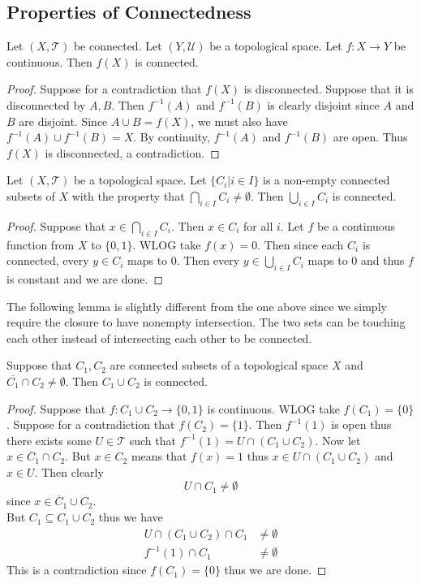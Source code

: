 \documentclass[a4paper]{article}
\begin{document}
\subsection{Properties of Connectedness}
\begin{prp}{}{} Let $(X,\mathcal{T})$ be connected. Let $(Y,\mathcal{U})$ be a topological space. Let $f:X\to Y$ be continuous. Then $f(X)$ is connected. 
\begin{proof}
Suppose for a contradiction that $f(X)$ is disconnected. Suppose that it is disconnected by $A,B$. Then $f^{-1}(A)$ and $f^{-1}(B)$ is clearly disjoint since $A$ and $B$ are disjoint. Since $A\cup B=f(X)$, we must also have $f^{-1}(A)\cup f^{-1}(B)=X$. By continuity, $f^{-1}(A)$ and $f^{-1}(B)$ are open. Thus $f(X)$ is disconnected, a contradiction. 
\end{proof}
\end{prp}

\begin{prp}{}{} Let $(X,\mathcal{T})$ be a topological space. Let $\{C_i|i\in I\}$ is a non-empty connected subsets of $X$ with the property that $\bigcap_{i\in I}C_i\neq\emptyset$. Then $\bigcup_{i\in I}C_i$ is connected. 
\begin{proof}
Suppose that $x\in\bigcap_{i\in I}C_i$. Then $x\in C_i$ for all $i$. Let $f$ be a continuous function from $X$ to $\{0,1\}$. WLOG take $f(x)=0$. Then since each $C_i$ is connected, every $y\in C_i$ maps to $0$. Then every $y\in\bigcup_{i\in I}C_i$ maps to $0$ and thus $f$ is constant and we are done. 
\end{proof}
\end{prp}

The following lemma is slightly different from the one above since we simply require the closure to have nonempty intersection. The two sets can be touching each other instead of intersecting each other to be connected. 

\begin{lmm}{}{} Suppose that $C_1,C_2$ are connected subsets of a topological space $X$ and $\overline{C_1}\cap C_2\neq\emptyset$. Then $C_1\cup C_2$ is connected. 
\begin{proof}
Suppose that $f:C_1\cup C_2\to\{0,1\}$ is continuous. WLOG take $f(C_1)=\{0\}$. Suppose for a contradiction that $f(C_2)=\{1\}$. Then $f^{-1}(1)$ is open thus there exists some $U\in\mathcal{T}$ such that $f^{-1}(1)=U\cap(C_1\cup C_2)$. Now let $x\in\overline{C}_1\cap C_2$. But $x\in C_2$ means that $f(x)=1$ thus $x\in U\cap(C_1\cup C_2)$ and $x\in U$. Then clearly $$U\cap C_1\neq\emptyset$$ since $x\in\overline{C}_1\cup C_2$. \\
But $C_1\subseteq C_1\cup C_2$ thus we have 
\begin{align*}
U\cap (C_1\cup C_2)\cap C_1&\neq\emptyset\\
f^{-1}(1)\cap C_1&\neq\emptyset
\end{align*}
This is a contradiction since $f(C_1)=\{0\}$ thus we are done. 
\end{proof}
\end{lmm}
\end{document}

